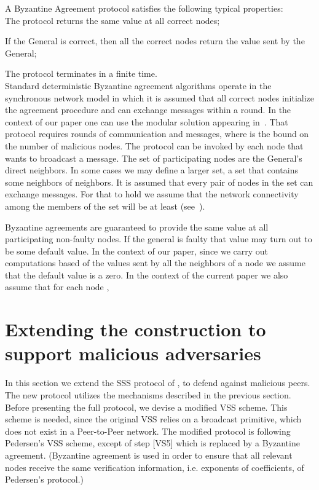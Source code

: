 \documentclass[10pt]{svjour3}
\begin{document}
A Byzantine Agreement protocol satisfies the following typical
properties:\\

 The protocol returns the same value at all
correct nodes;

 If the General is correct,  then  all the
correct nodes return the value sent by the General;

 The protocol terminates in a finite
time.\\

Standard deterministic Byzantine agreement algorithms operate in the
synchronous network model in which it is assumed that all correct
nodes initialize the agreement procedure and can exchange messages
within a round.  In the context of our paper one can use the modular
solution appearing in~\cite{FastAgree87}. That protocol requires
 rounds of communication and  messages, where  is
the bound on the number of malicious nodes. The protocol can be
invoked by each node that wants to broadcast a message. The set of
participating nodes are the General's direct neighbors. In some cases
we may define a larger set, a set that contains some neighbors of
neighbors.
It is assumed that every pair of nodes in the set can exchange messages.
For that to hold we assume that  the network connectivity among the members of the set will be at least  (see~\cite{d82}).

Byzantine agreements are guaranteed to provide the same value at all participating non-faulty nodes. If the general is faulty that value may turn out to be some default value.  In the context of our paper, since we carry out computations based of the values  sent by all the neighbors of a node we assume that the default value is a zero. In the context of the current paper we also assume that for each node , 



\section{Extending the construction to support malicious adversaries}
\label{malicious}

In this section we extend the SSS protocol of , to
defend against malicious peers.  The new protocol utilizes the
mechanisms described in the previous section.  Before presenting the
full protocol, we devise a modified VSS scheme.  This scheme is
needed, since the original VSS relies on a broadcast primitive, which
does not exist in a Peer-to-Peer network. The modified protocol is
following Pedersen's VSS scheme, except of step [VS5] which is
replaced by a Byzantine agreement. (Byzantine agreement is used in
order to ensure that all relevant nodes receive the same verification
information, i.e. exponents of coefficients, of Pedersen's protocol.)
\end{document}
